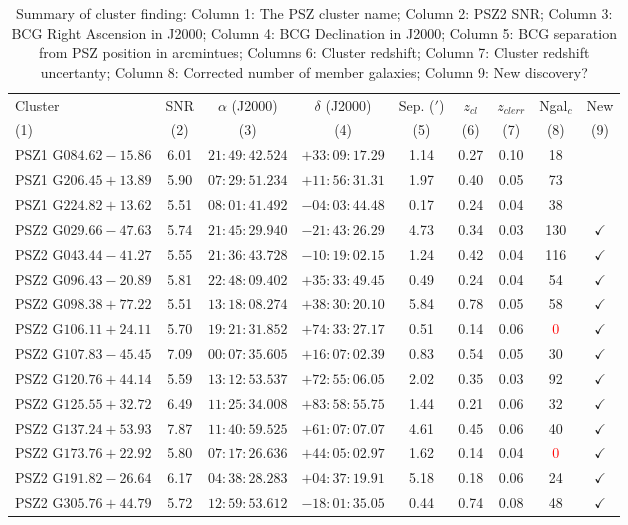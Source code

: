 \documentclass[apj, revtex4-1]{emulateapj}
\newcommand{\editorial}[1]{\textcolor{red}{#1}}
\begin{document}
\begin{table}
	\caption[Summary of Cluster Finding]{Summary of cluster finding: Column 1: The PSZ cluster name; Column 2: PSZ2 SNR; Column 3: BCG Right Ascension in J2000; Column 4: BCG Declination in J2000; Column 5: BCG separation from PSZ position in arcmintues; Columns 6: Cluster redshift; Column 7: Cluster redshift uncertanty; Column 8: Corrected number of member galaxies; Column 9: New discovery? }
	\centering
	\begin{tabular}{lcccccccc}
	\hline
	Cluster & SNR & $\alpha$ (J2000) & $\delta$ (J2000) & Sep. ($'$) & $z_{cl}$ & $z_{clerr}$ & Ngal$_c$ & New\\
	(1) & (2) & (3) & (4) & (5) & (6) & (7) & (8) & (9)\\
	\hline
	 PSZ1 G$084.62-15.86$ & 6.01 & $21:49:42.524$ & $+33:09:17.29$ & 1.14 & 0.27 & 0.10 & 18 & \\
	 PSZ1 G$206.45+13.89$ & 5.90 & $07:29:51.234$ & $+11:56:31.31$ & 1.97 & 0.40 & 0.05 & 73 & \\
	 PSZ1 G$224.82+13.62$ & 5.51 & $08:01:41.492$ & $-04:03:44.48$ & 0.17 & 0.24 & 0.04 & 38 & \\
	 PSZ2 G$029.66-47.63$ & 5.74 & $21:45:29.940$ & $-21:43:26.29$ & 4.73 & 0.34 & 0.03 & 130 & $\checkmark$ \\
	 PSZ2 G$043.44-41.27$ & 5.55 & $21:36:43.728$ & $-10:19:02.15$ & 1.24 & 0.42 & 0.04 & 116 & $\checkmark$ \\
	 PSZ2 G$096.43-20.89$ & 5.81 & $22:48:09.402$ & $+35:33:49.45$ & 0.49 & 0.24 & 0.04 & 54 & $\checkmark$ \\
	 PSZ2 G$098.38+77.22$ & 5.51 & $13:18:08.274$ & $+38:30:20.10$ & 5.84 & 0.78 & 0.05 & 58 & $\checkmark$ \\
	 PSZ2 G$106.11+24.11$ & 5.70 & $19:21:31.852$ & $+74:33:27.17$ & 0.51 & 0.14 & 0.06 & \editorial{0} & $\checkmark$ \\
	 PSZ2 G$107.83-45.45$ & 7.09 & $00:07:35.605$ & $+16:07:02.39$ & 0.83 & 0.54 & 0.05 & 30 & $\checkmark$ \\
	 PSZ2 G$120.76+44.14$ & 5.59 & $13:12:53.537$ & $+72:55:06.05$ & 2.02 & 0.35 & 0.03 & 92 & $\checkmark$ \\
	 PSZ2 G$125.55+32.72$ & 6.49 & $11:25:34.008$ & $+83:58:55.75$ & 1.44 & 0.21 & 0.06 & 32 & $\checkmark$ \\
	 PSZ2 G$137.24+53.93$ & 7.87 & $11:40:59.525$ & $+61:07:07.07$ & 4.61 & 0.45 & 0.06 & 40 & $\checkmark$ \\
	 PSZ2 G$173.76+22.92$ & 5.80 & $07:17:26.636$ & $+44:05:02.97$ & 1.62 & 0.14 & 0.04 & \editorial{0} & $\checkmark$ \\
	 PSZ2 G$191.82-26.64$ & 6.17 & $04:38:28.283$ & $+04:37:19.91$ & 5.18 & 0.18 & 0.06 & 24 & $\checkmark$ \\
	 PSZ2 G$305.76+44.79$ & 5.72 & $12:59:53.612$ & $-18:01:35.05$ & 0.44 & 0.74 & 0.08 & 48 & $\checkmark$ \\
	\hline
	\end{tabular}
\label{tbl:results}
\end{table}
\end{document}
